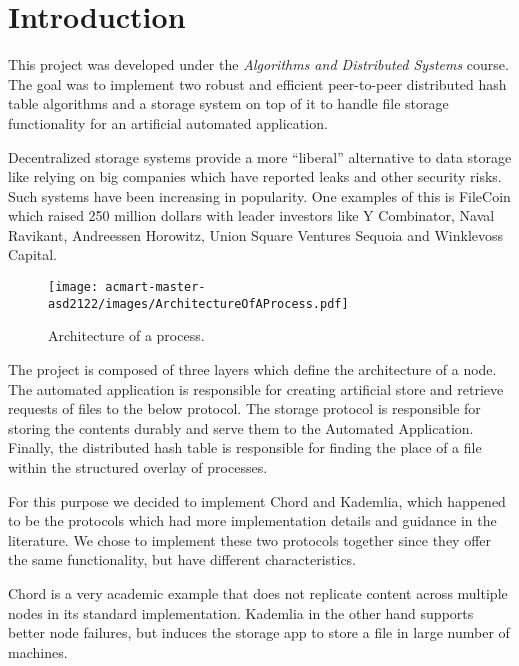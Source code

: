 \documentclass[sigconf]{acmart}
\begin{document}
\section{Introduction}
This project was developed under the \emph{Algorithms and Distributed Systems} course. The goal was to implement two robust and efficient peer-to-peer distributed hash table algorithms and a storage system on top of it to handle file storage functionality for an artificial automated application.

Decentralized storage systems provide a more ``liberal'' alternative to data storage like relying on big companies which have reported leaks and other security risks.  Such systems have been increasing in popularity. One examples of this is FileCoin which raised 250 million dollars with leader investors like Y Combinator, Naval Ravikant, Andreessen Horowitz, Union Square Ventures Sequoia and Winklevoss Capital.


\begin{figure}
\texttt{[image: acmart-master-asd2122/images/ArchitectureOfAProcess.pdf]}
\centering
\caption{Architecture of a process.}
\label{fig:processArchitecture}
\end{figure}

The project is composed of three layers which define the architecture of a node. The automated application is responsible for creating artificial store  and retrieve requests of files to the below protocol. The storage protocol is responsible for storing the contents durably and serve them to the Automated Application. Finally, the distributed hash table is responsible for finding the place of a file within the structured overlay of processes.

For this purpose we decided to implement Chord and Kademlia, which happened to be the protocols which had more implementation details and guidance in the literature. We chose to implement these two protocols together since they offer the same functionality, but have different characteristics.

Chord is a very academic example that does not replicate content across multiple nodes in its standard implementation. Kademlia in the other hand supports better node failures, but induces the storage app to store a file in large number of machines.
\end{document}
